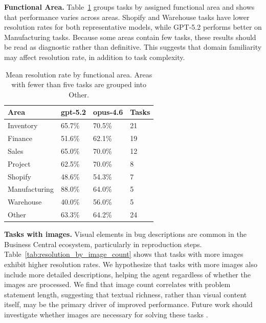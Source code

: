 \documentclass{article}
\begin{document}
\textbf{Functional Area.} Table~\ref{tab:resolution_by_area} groups tasks by assigned functional area and shows that performance varies across areas. Shopify and Warehouse tasks have lower resolution rates for both representative models, while GPT-5.2 performs better on Manufacturing tasks. Because some areas contain few tasks, these results should be read as diagnostic rather than definitive. This suggests that domain familiarity may affect resolution rate, in addition to task complexity.

\begin{table}[t]
\vskip 0.05in
\begin{center}
\begin{small}
\begin{sc}
\begin{tabular}{llll}
\toprule
\textbf{Area} & \textbf{gpt-5.2} & \textbf{opus-4.6} & \textbf{Tasks} \\
\midrule
Inventory     & 65.7\% & 70.5\% & 21 \\
Finance       & 51.6\% & 62.1\% & 19 \\
Sales         & 65.0\% & 70.0\% & 12 \\
Project       & 62.5\% & 70.0\% & 8 \\
Shopify       & 48.6\% & 54.3\% & 7 \\
Manufacturing & 88.0\% & 64.0\% & 5 \\
Warehouse     & 40.0\% & 56.0\% & 5 \\
Other         & 63.3\% & 64.2\% & 24 \\
\bottomrule
\end{tabular}
\end{sc}
\end{small}
\end{center}
\caption{Mean resolution rate by functional area. Areas with fewer than five tasks are grouped into Other.}
\label{tab:resolution_by_area}
\vskip 0.1in
\end{table}

\textbf{Tasks with images.} Visual elements in bug descriptions are common in the Business Central ecosystem, particularly in reproduction steps. Table~\ref{tab:resolution_by_image_count} shows that tasks with more images exhibit higher resolution rates. We hypothesize that tasks with more images also include more detailed descriptions, helping the agent regardless of whether the images are processed. We find that image count correlates with problem statement length, suggesting that textual richness, rather than visual content itself, may be the primary driver of improved performance. Future work should investigate whether images are necessary for solving these tasks \cite{yang_swe-bench_2024}.
\end{document}
